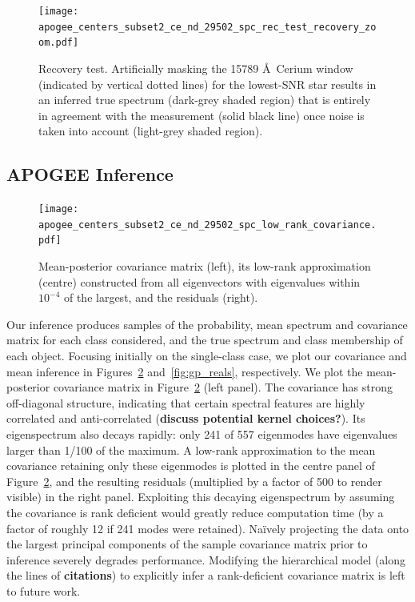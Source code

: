 \documentclass[a4paper,fleqn,usenatbib]{mnras}
\begin{document}
\begin{figure}
	\texttt{[image: apogee\_centers\_subset2\_ce\_nd\_29502\_spc\_rec\_test\_recovery\_zoom.pdf]}
    \caption{Recovery test. Artificially masking the 15789 \AA\ Cerium window (indicated by vertical dotted lines) for the lowest-SNR star results in an inferred true spectrum (dark-grey shaded region) that is entirely in agreement with the measurement (solid black line) once noise is taken into account (light-grey shaded region).}
    \label{fig:recovery_test}
\end{figure}

\subsection{APOGEE Inference}

\begin{figure}
	\texttt{[image: apogee\_centers\_subset2\_ce\_nd\_29502\_spc\_low\_rank\_covariance.pdf]}
    \caption{Mean-posterior covariance matrix (left), its low-rank approximation (centre) constructed from all eigenvectors with eigenvalues within $10^{-4}$ of the largest, and the residuals (right).}
    \label{fig:inferred_cov}
\end{figure}

Our inference produces samples of the probability, mean spectrum and covariance matrix for each class considered, and the true spectrum and class membership of each object. Focusing initially on the single-class case, we plot our covariance and mean inference in Figures~\ref{fig:inferred_cov} and~\ref{fig:gp_reals}, respectively. We plot the mean-posterior covariance matrix in Figure~\ref{fig:inferred_cov} (left panel). The covariance has strong off-diagonal structure, indicating that certain spectral features are highly correlated and anti-correlated ({\bf discuss potential kernel choices?}). Its eigenspectrum also decays rapidly: only 241 of 557 eigenmodes have eigenvalues larger than  1/100 of the maximum. A low-rank approximation to the mean covariance retaining only these eigenmodes is plotted in the centre panel of Figure~\ref{fig:inferred_cov}, and the resulting residuals (multiplied by a factor of 500 to render visible) in the right panel. Exploiting this decaying eigenspectrum by assuming the covariance is rank deficient would greatly reduce computation time (by a factor of roughly 12 if 241 modes were retained). Na\"ively projecting the data onto the largest principal components of the sample covariance matrix prior to inference severely degrades performance. Modifying the hierarchical model (along the lines of {\bf citations}) to explicitly infer a rank-deficient covariance matrix is left to future work.
\end{document}
